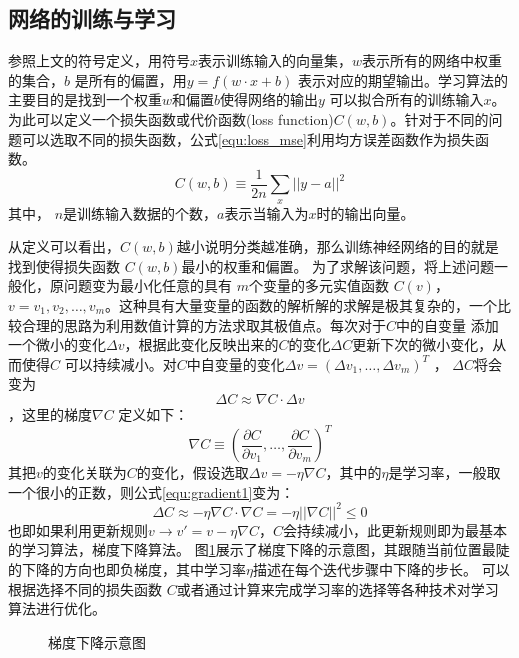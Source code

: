 \subsection{网络的训练与学习}
参照上文的符号定义，用符号$x $表示训练输入的向量集，$w$表示所有的网络中权重的集合，$b$ 是所有的偏置，用$y=f(w\cdot x + b)$ 表示对应的期望输出。学习算法的主要目的是找到一个权重$w$和偏置$b$使得网络的输出$y$ 可以拟合所有的训练输入$x$。为此可以定义一个损失函数或代价函数(loss function)$C(w,b)$。针对于不同的问题可以选取不同的损失函数，公式\ref{equ:loss_mse}利用均方误差函数作为损失函数。
\begin{equation}
C(w,b)\equiv \frac{1}{2n}\sum_x||y-a||^2
\label{equ:loss_mse}
\end{equation}
其中， $n$是训练输入数据的个数，$a$表示当输入为$x$时的输出向量。

从定义可以看出，$C(w,b) $越小说明分类越准确，那么训练神经网络的目的就是找到使得损失函数 $C(w,b)$最小的权重和偏置。
为了求解该问题，将上述问题一般化，原问题变为最小化任意的具有 $m $个变量的多元实值函数 $C(v) $， $v=v_1,v_2,\dots,v_m $。这种具有大量变量的函数的解析解的求解是极其复杂的，一个比较合理的思路为利用数值计算的方法求取其极值点。每次对于$C $中的自变量 添加一个微小的变化$\Delta v $，根据此变化反映出来的$C $的变化$\Delta C $更新下次的微小变化，从而使得$C $ 可以持续减小。对$C $中自变量的变化$\Delta v=(\Delta v_1,\dots,\Delta v_m)^T $ ， $\Delta C $将会变为
\begin{equation}
    \Delta C \approx \nabla C \cdot \Delta v
    \label{equ:gradient1}
\end{equation}
，这里的梯度$\nabla C $ 定义如下：
\begin{equation}
\nabla C \equiv (\frac{\partial C}{\partial v_1},\dots,\frac{\partial C}{\partial v_m})^T
\end{equation}
其把$v$的变化关联为$C$的变化，假设选取$\Delta v=-\eta \nabla C $，其中的$\eta $是学习率，一般取一个很小的正数，则公式\ref{equ:gradient1}变为：
\begin{equation}
\Delta C \approx -\eta\nabla C\cdot\nabla C=-\eta||\nabla C||^2 \leq 0
\end{equation}
也即如果利用更新规则$v \rightarrow v'=v-\eta \nabla C$，$C$会持续减小，此更新规则即为最基本的学习算法，梯度下降算法。
图\ref{fig:gradient-descent}展示了梯度下降的示意图，其跟随当前位置最陡的下降的方向也即负梯度，其中学习率$ \eta $描述在每个迭代步骤中下降的步长。
可以根据选择不同的损失函数 $C $或者通过计算来完成学习率的选择等各种技术对学习算法进行优化。
\begin{figure}[hbt]
	\centering
  
  \caption{梯度下降示意图}
    \label{fig:gradient-descent}
\end{figure}

